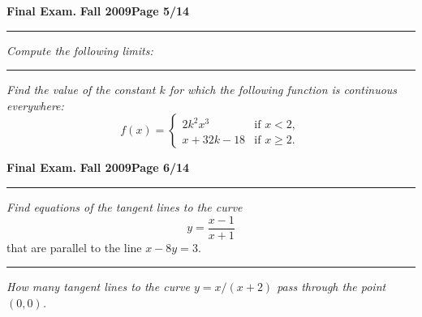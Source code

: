 \documentclass[12pt]{article}
\begin{document}
\newpage

\hfill{\large\bf Final Exam.}\hfill{\large\bf
  Fall 2009}\hfill{\large\bf Page 5/14}\hrule

\bigskip
{\problem[15 pts] \em Compute the following limits:}
\vspace{1cm}

\noindent
{}

\vspace{3cm}
\hrule

{\problem[10 pts] \em Find the value of the constant $k$ for which the
  following function is continuous everywhere:} 
\begin{equation*}
f(x) = \begin{cases}
2k^2x^3 &\text{if }x<2, \\
x+32k-18 &\text{if }x \geq 2.
\end{cases}
\end{equation*}
\vspace{5cm}
\begin{flushright}
\end{flushright}

\newpage


\hfill{\large\bf Final Exam.}\hfill{\large\bf
  Fall 2009}\hfill{\large\bf Page 6/14}\hrule

\bigskip
{\problem[15 pts] \em Find equations of the tangent lines to the curve}
\begin{equation*}
  y = \frac{x-1}{x+1}
\end{equation*}
that are parallel to the line $x-8y=3$.
\vspace{8cm}
\hrule
{\problem[10 pts] \em How many tangent lines to the curve $y=x/(x+2)$
  pass through the point $(0,0)$.}      
\end{document}
